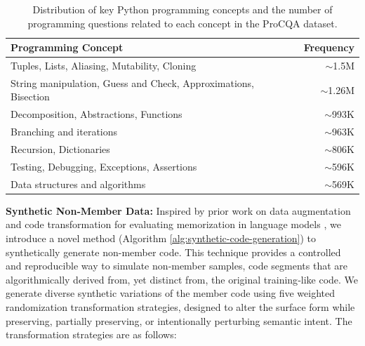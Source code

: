 \documentclass[runningheads]{llncs}
\begin{document}
\begin{table}[htbp]
\small
\centering
\caption{Distribution of key Python programming concepts and the number of programming questions related to each concept in the ProCQA dataset.}
\label{tab:python_concepts}
\begin{tabular}{|l|r|}
\hline
\textbf{Programming Concept} & \textbf{Frequency} \\
\hline
Tuples, Lists, Aliasing, Mutability, Cloning & $\sim$1.5M \\
String manipulation, Guess and Check, Approximations, Bisection & $\sim$1.26M \\
Decomposition, Abstractions, Functions & $\sim$993K \\
Branching and iterations & $\sim$963K \\
Recursion, Dictionaries & $\sim$806K \\
Testing, Debugging, Exceptions, Assertions & $\sim$596K \\
Data structures and algorithms & $\sim$569K \\
\hline
\end{tabular}
\end{table}


\noindent \textbf{Synthetic Non‑Member Data:}
Inspired by prior work on data augmentation and code transformation for evaluating memorization in language models \cite{r48, r50, r52, r54, r56}, we introduce a novel method (Algorithm \ref{alg:synthetic-code-generation}) to synthetically generate non-member code. This technique provides a controlled and reproducible way to simulate non‑member samples, code segments that are algorithmically derived from, yet distinct from, the original training‑like code. We generate diverse synthetic variations of the member code using five weighted randomization transformation strategies, designed to alter the surface form while preserving, partially preserving, or intentionally perturbing semantic intent. The transformation strategies are as follows:
\end{document}
